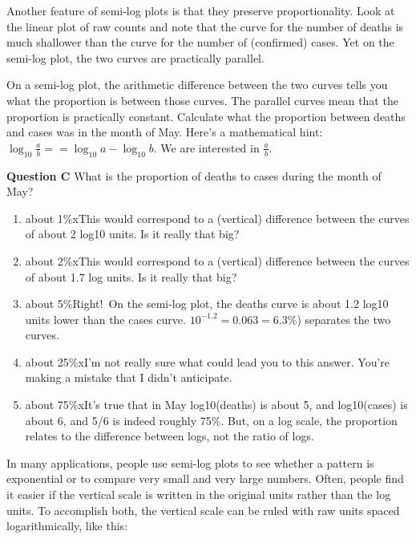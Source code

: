 \documentclass[
  letterpaper,
  DIV=11,
  numbers=noendperiod,
  oneside]{article}
\providecommand{\tightlist}{%
  \setlength{\itemsep}{0pt}\setlength{\parskip}{0pt}}\usepackage{longtable,booktabs,array}
\begin{document}
\begin{multicols}{2}
Another feature of semi-log plots is that they preserve proportionality.
Look at the linear plot of raw counts and note that the curve for the
number of deaths is much shallower than the curve for the number of
(confirmed) cases. Yet on the semi-log plot, the two curves are
practically parallel.

On a semi-log plot, the arithmetic difference between the two curves
tells you what the proportion is between those curves. The parallel
curves mean that the proportion is practically constant. Calculate what
the proportion between deaths and cases was in the month of May. Here's
a mathematical hint:
\(\log_{10} \frac{a}{b} == \log_{10} a - \log_{10} b\). We are
interested in \(\frac{a}{b}\).

\textbf{Question C} What is the proportion of deaths to cases during the
month of May?

\begin{enumerate}
\def\labelenumi{\roman{enumi}.}
\tightlist
\item
  {about 1\%{xThis would correspond to a (vertical) difference between
  the curves of about 2 log10 units. Is it really that big?}}\\
\item
  {about 2\%{xThis would correspond to a (vertical) difference between
  the curves of about 1.7 log units. Is it really that big?}}\\
\item
  {about 5\%{Right!~On the semi-log plot, the deaths curve is about 1.2
  log10 units lower than the cases curve. \(10^{-1.2} = 0.063 = 6.3\%\))
  separates the two curves.}}\\
\item
  {about 25\%{xI'm not really sure what could lead you to this answer.
  You're making a mistake that I didn't anticipate.}}\\
\item
  {about 75\%{xIt's true that in May log10(deaths) is about 5, and
  log10(cases) is about 6, and 5/6 is indeed roughly 75\%. But, on a log
  scale, the proportion relates to the difference between logs, not the
  ratio of logs.}}
\end{enumerate}

In many applications, people use semi-log plots to see whether a pattern
is exponential or to compare very small and very large numbers. Often,
people find it easier if the vertical scale is written in the original
units rather than the log units. To accomplish both, the vertical scale
can be ruled with raw units spaced logarithmically, like this:


\end{multicols}
\end{document}
